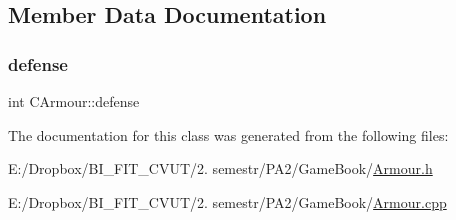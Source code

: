 \subsection{Member Data Documentation}
\mbox{\label{class_c_armour_ad071169660d837db44ff38e73c92dd10}} 
\subsubsection{\texorpdfstring{defense}{defense}}
{\footnotesize\ttfamily int C\+Armour\+::defense\hspace{0.3cm}{\ttfamily [protected]}}



The documentation for this class was generated from the following files\+:\begin{DoxyCompactItemize}
\item 
E\+:/\+Dropbox/\+B\+I\+\_\+\+F\+I\+T\+\_\+\+C\+V\+U\+T/2. semestr/\+P\+A2/\+Game\+Book/\mbox{\hyperlink{_armour_8h}{Armour.\+h}}\item 
E\+:/\+Dropbox/\+B\+I\+\_\+\+F\+I\+T\+\_\+\+C\+V\+U\+T/2. semestr/\+P\+A2/\+Game\+Book/\mbox{\hyperlink{_armour_8cpp}{Armour.\+cpp}}\end{DoxyCompactItemize}
